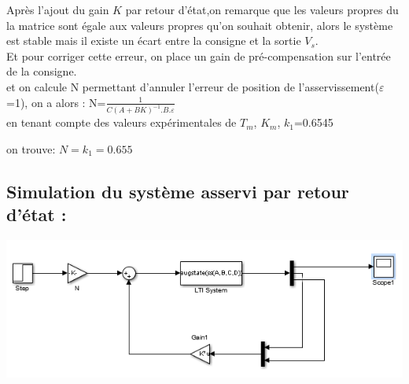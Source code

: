Après l'ajout du gain $K$ par retour d'état,on remarque que les valeurs propres du la matrice sont égale aux valeurs propres qu'on souhait obtenir, alors le système est stable mais il existe un écart entre la consigne et la sortie $V_{s}$.\\
Et pour corriger cette erreur, on place un gain de pré-compensation sur l'entrée de la consigne.\\

et on calcule N permettant d'annuler l'erreur de position de l'asservissement($\varepsilon$=1), on a alors : N=$\frac{1}{C(A+BK)^{-1}.B.\varepsilon}$ \\

en tenant compte des valeurs expérimentales de $T_{m}$, $K_{m}$, $k_{1}$=0.6545 

on trouve: $N=k_{1}=0.655$\\

\subsection{Simulation du système asservi par retour d'état :}


\begin{center}
\includegraphics[scale=0.7]{simulink_retourdetat.PNG}
\label{fig1} 
\end{center}











